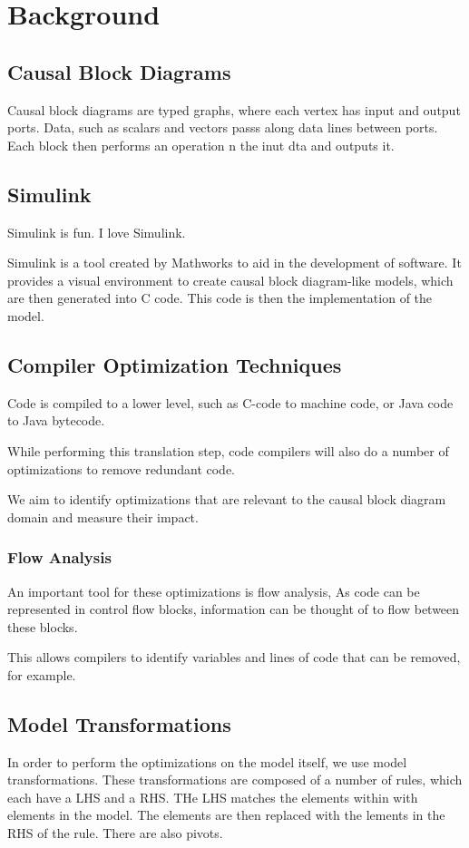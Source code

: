 \section{Background}

\subsection{Causal Block Diagrams}
Causal block diagrams are typed graphs, where each vertex has input and output ports. Data, such as scalars and vectors passs along data lines between ports. Each block then performs an operation n the inut dta and outputs it.

\subsection{Simulink}

Simulink is fun. I love Simulink.

Simulink is a tool created by Mathworks to aid in the development of software. It provides a visual environment to create causal block diagram-like models, which are then generated into C code. This code is then the implementation of the model.


\subsection{Compiler Optimization Techniques}

Code is compiled to a lower level, such as C-code to machine code, or Java code to Java bytecode.

While performing this translation step, code compilers will also do a number of optimizations to remove redundant code.

We aim to identify optimizations that are relevant to the causal block diagram domain and measure their impact.




\subsubsection{Flow Analysis}

An important tool for these optimizations is flow analysis, As code can be represented in control flow blocks, information can be thought of to flow between these blocks.

This allows compilers to identify variables and lines of code that can be removed, for example.




\subsection{Model Transformations}

In order to perform the optimizations on the model itself, we use model transformations. These transformations are composed of a number of rules, which each have a LHS and a RHS. THe LHS matches the elements within with elements in the model. The elements are then replaced with the lements in the RHS of the rule. There are also pivots.
